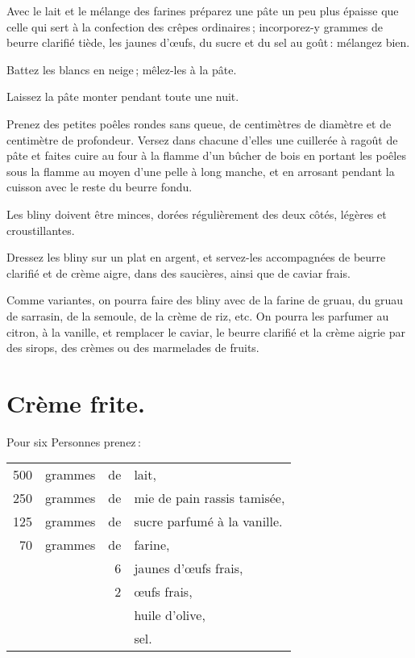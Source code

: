 Avec le lait et le mélange des farines préparez une pâte un peu plus épaisse
que celle qui sert à la confection des crêpes ordinaires ; incorporez-y
{\mmm} grammes de beurre clarifié tiède, les jaunes d'œufs, du sucre et
du sel au goût : mélangez bien.

Battez les blancs en neige ; mêlez-les à la pâte.

Laissez la pâte monter pendant toute une nuit.

Prenez des petites poêles rondes sans queue, de {\mmm} centimètres de
diamètre et de {\mmm} centimètre de profondeur. Versez dans chacune
d'elles une cuillerée à ragoût de pâte et faites cuire au four à la flamme d'un
bûcher de bois en portant les poêles sous la flamme au moyen d'une pelle à long
manche, et en arrosant pendant la cuisson avec le reste du beurre fondu.

Les bliny doivent être minces, dorées régulièrement des deux côtés, légères et
croustillantes.

Dressez les bliny sur un plat en argent, et servez-les accompagnées de beurre
clarifié et de crème aigre, dans des saucières, ainsi que de caviar frais.

\sk

Comme variantes, on pourra faire des bliny avec de la farine de gruau, du gruau
de sarrasin, de la semoule, de la crème de riz, etc. On pourra les parfumer au
citron, à la vanille, et remplacer le caviar, le beurre clarifié et la crème
aigrie par des sirops, des crèmes ou des marmelades de fruits.

\section*{\centering Crème frite.}
{}

Pour six Personnes prenez :

\footnotesize
\begin{longtable}{rrrp{16em}}
    500 & grammes & de & lait,                                                                            \\
    250 & grammes & de & mie de pain rassis tamisée,                                                      \\
    125 & grammes & de & sucre parfumé à la vanille.                                                      \\
     70 & grammes & de & farine,                                                                          \\
        &         &  6 & jaunes d'œufs frais,                                                             \\
        &         &  2 & œufs frais,                                                                      \\
        &         &    & huile d'olive,                                                                   \\
        &         &    & sel.                                                                             \\
\end{longtable}
\normalsize

